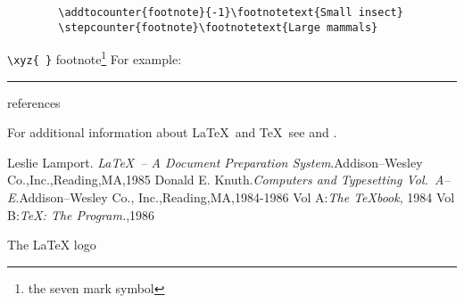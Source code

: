 \documentclass[12pt,twoside,a4paper]{article}   %
\begin{document}
	\begin{verbatim}
		\addtocounter{footnote}{-1}\footnotetext{Small insect}
		\stepcounter{footnote}\footnotetext{Large mammals}
	\end{verbatim}
	\verb=\xyz{ }= %
	\newline
	\renewcommand{\thefootnote}{\fnsymbol{footnote}}
	footnote\footnote[7]{the seven mark symbol}
	\renewcommand{\thefootnote}{\arabic{footnote}}
	For example: 
	\addtocounter{footnote}{-1} 
	\begin{marginpar}{\rule[-17.5mm]{1mm}{20mm}}
	\end{marginpar}
	\marginpar[\hfill$\Longrightarrow$]{$\Longleftarrow$}
	\begin{thebibliography}{+} %
		references
	\end{thebibliography}
	\newpage
	For additional information about \LaTeX\ and \TeX\ see \cite{lamport} and \cite{knuth, knuth:a}.
	\begin{thebibliography}{99}
		 Leslie Lamport. \textsl{\LaTeX\ -- A Document Preparation System}.Addison--Wesley Co.,Inc.,Reading,MA,1985
		 Donald E. Knuth.\textsl{Computers and Typesetting Vol.\ A--E}.Addison--Wesley Co., Inc.,Reading,MA,1984-1986
		 Vol A:\textsl{The \TeX book}, 1984
		 Vol B:\textsl{\TeX: The Program.},1986
	\end{thebibliography}
	\newpage
	The \LaTeX{} logo
\end{document}
